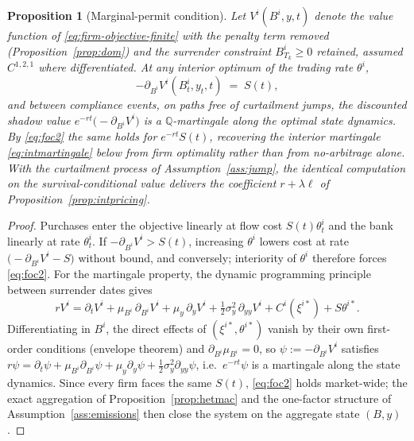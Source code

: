 \documentclass[11pt,letterpaper]{article}
\theoremstyle{plain}
\newtheorem{proposition}[theorem]{Proposition}
\theoremstyle{definition}
\newcommand{\Qmeasure}{\mathbb{Q}}           %
\numberwithin{equation}{section}
\begin{document}
\begin{proposition}[Marginal-permit condition]\label{prop:foc2}
Let $V^i(B^i,y,t)$ denote the value function of \eqref{eq:firm-objective-finite} with the penalty term removed (Proposition~\ref{prop:dom}) and the surrender constraint $B^i_{T_k}\ge0$ retained, assumed $C^{1,2,1}$ where differentiated. At any interior optimum of the trading rate $\theta^i$,
\begin{equation}\label{eq:foc2}
  -\partial_{B^i}V^i(B^i_t,y_t,t)\;=\;S(t),
\end{equation}
and between compliance events, on paths free of curtailment jumps, the discounted shadow value $e^{-rt}\bigl(-\partial_{B^i}V^i\bigr)$ is a $\Qmeasure$-martingale along the optimal state dynamics. By \eqref{eq:foc2} the same holds for $e^{-rt}S(t)$, recovering the interior martingale \eqref{eq:intmartingale} below from firm optimality rather than from no-arbitrage alone. With the curtailment process of Assumption~\ref{ass:jump}, the identical computation on the survival-conditional value delivers the coefficient $r+\lambda\ell$ of Proposition~\ref{prop:intpricing}.
\end{proposition}
\begin{proof}
Purchases enter the objective linearly at flow cost $S(t)\theta^i_t$ and the bank linearly at rate $\theta^i_t$. If $-\partial_{B^i}V^i>S(t)$, increasing $\theta^i$ lowers cost at rate $\bigl(-\partial_{B^i}V^i-S\bigr)$ without bound, and conversely; interiority of $\theta^i$ therefore forces \eqref{eq:foc2}. For the martingale property, the dynamic programming principle between surrender dates gives
\[
rV^i=\partial_tV^i+\mu_{B^i}\,\partial_{B^i}V^i+\mu_y\,\partial_yV^i+\tfrac12\sigma_y^2\,\partial_{yy}V^i+C^i(\xi^{i*})+S\theta^{i*}.
\]
Differentiating in $B^i$, the direct effects of $(\xi^{i*},\theta^{i*})$ vanish by their own first-order conditions (envelope theorem) and $\partial_{B^i}\mu_{B^i}=0$, so $\psi:=-\partial_{B^i}V^i$ satisfies $r\psi=\partial_t\psi+\mu_{B^i}\partial_{B^i}\psi+\mu_y\partial_y\psi+\tfrac12\sigma_y^2\partial_{yy}\psi$, i.e.\ $e^{-rt}\psi$ is a martingale along the state dynamics. Since every firm faces the same $S(t)$, \eqref{eq:foc2} holds market-wide; the exact aggregation of Proposition~\ref{prop:hetmac} and the one-factor structure of Assumption~\ref{ass:emissions} then close the system on the aggregate state $(B,y)$.
\end{proof}
\end{document}
